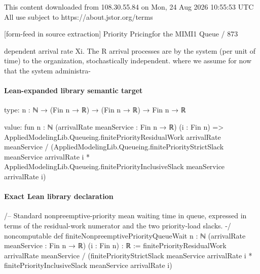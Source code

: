 \documentclass[10pt]{article}
\begin{document}
\begin{ReviewVerbatim}
                                                 This content downloaded from
                               108.30.55.84 on Mon, 24 Aug 2026 10:55:53 UTC
                                         All use subject to https://about.jstor.org/terms

[form-feed in source extraction]
                                                                                Priority Pricingfor the MIMI1 Queue / 873

dependent arrival rate Xi. The R arrival processes are                 by the system (per unit of time) to the organization,
stochastically independent.                                            where we assume for now that the system administra-
\end{ReviewVerbatim}



\paragraph{Lean-expanded library semantic target}
\begin{ReviewVerbatim}
type:
{n : ℕ} → (Fin n → ℝ) → (Fin n → ℝ) → Fin n → ℝ

value:
fun {n : ℕ} (arrivalRate meanService : Fin n → ℝ) (i : Fin n) =>
  AppliedModelingLib.Queueing.finitePriorityResidualWork arrivalRate meanService /
    (AppliedModelingLib.Queueing.finitePriorityStrictSlack meanService arrivalRate i *
      AppliedModelingLib.Queueing.finitePriorityInclusiveSlack meanService arrivalRate i)
\end{ReviewVerbatim}

\paragraph{Exact Lean library declaration}
\begin{ReviewVerbatim}
/-- Standard nonpreemptive-priority mean waiting time in queue, expressed in
terms of the residual-work numerator and the two priority-load slacks. -/
noncomputable def finiteNonpreemptivePriorityQueueWait
    {n : ℕ} (arrivalRate meanService : Fin n → ℝ) (i : Fin n) : ℝ :=
  finitePriorityResidualWork arrivalRate meanService /
    (finitePriorityStrictSlack meanService arrivalRate i *
      finitePriorityInclusiveSlack meanService arrivalRate i)
\end{ReviewVerbatim}
\end{document}
